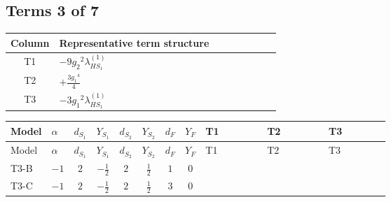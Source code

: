 \documentclass[8pt]{article}
\begin{document}
\begin{landscape}
\subsection*{Terms 3 of 7}
\begin{center}
\begin{tabular}{@{}c >{\raggedright\arraybackslash}p{0.82\linewidth}@{}}
\toprule
Column & Representative term structure \\
\midrule
T1 & \(\displaystyle -9 {g_2}^2 {\lambda_{HS_1}^{(1)}}\) \\
\midrule
T2 & \(\displaystyle +\frac{3 {g_1}^4}{4}\) \\
\midrule
T3 & \(\displaystyle -3 {g_1}^2 {\lambda_{HS_1}^{(1)}}\) \\
\midrule
\bottomrule
\end{tabular}
\end{center}
\smallskip
\tiny
\begin{longtable}{@{}llcccccc >{\raggedright\arraybackslash}p{0.21\linewidth} >{\raggedright\arraybackslash}p{0.21\linewidth} >{\raggedright\arraybackslash}p{0.21\linewidth}@{}}
\toprule
Model & $\alpha$ & $d_{S_1}$ & $Y_{S_1}$ & $d_{S_2}$ & $Y_{S_2}$ & $d_F$ & $Y_F$ & T1 & T2 & T3 \\
\midrule
\endfirsthead
\toprule
Model & $\alpha$ & $d_{S_1}$ & $Y_{S_1}$ & $d_{S_2}$ & $Y_{S_2}$ & $d_F$ & $Y_F$ & T1 & T2 & T3 \\
\midrule
\endhead
T3-B & $-1$ & $2$ & $-\frac{1}{2}$ & $2$ & $\frac{1}{2}$ & $1$ & $0$ & \scriptsize\adjustbox{max width=\linewidth}{$\begin{gathered} -9 {g_2}^2 {\lambda_{HS_1}^{(1)}}\end{gathered}$} & \scriptsize\adjustbox{max width=\linewidth}{$\begin{gathered} +\frac{3 {g_1}^4}{4}\end{gathered}$} & \scriptsize\adjustbox{max width=\linewidth}{$\begin{gathered} -3 {g_1}^2 {\lambda_{HS_1}^{(1)}}\end{gathered}$} \\
\midrule
T3-C & $-1$ & $2$ & $-\frac{1}{2}$ & $2$ & $\frac{1}{2}$ & $3$ & $0$ & \scriptsize\adjustbox{max width=\linewidth}{$\begin{gathered} -9 {g_2}^2 {\lambda_{HS_1}^{(1)}}\end{gathered}$} & \scriptsize\adjustbox{max width=\linewidth}{$\begin{gathered} +\frac{3 {g_1}^4}{4}\end{gathered}$} & \scriptsize\adjustbox{max width=\linewidth}{$\begin{gathered} -3 {g_1}^2 {\lambda_{HS_1}^{(1)}}\end{gathered}$} \\

\end{longtable}
\end{landscape}
\end{document}
